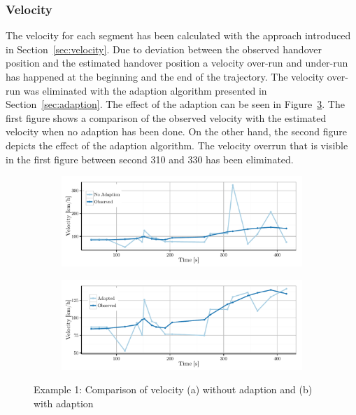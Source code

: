 \subsubsection{Velocity}
The velocity for each segment has been calculated with the approach introduced in Section~\ref{sec:velocity}. Due to deviation between the observed handover position and the estimated handover position a velocity over-run and under-run has happened at the beginning and the end of the trajectory. The velocity over-run was eliminated with the adaption algorithm presented in Section~\ref{sec:adaption}. The effect of the adaption can be seen in Figure~\ref{fig:563velocity}. The first figure shows a comparison of the observed velocity with the estimated velocity when no adaption has been done. On the other hand, the second figure depicts the effect of the adaption algorithm. The velocity overrun that is visible in the first figure between second 310 and 330 has been eliminated.
\begin{figure}
	\centering
	\begin{subfigure}[b]{\textwidth}
		\includegraphics[width=\textwidth]{./images/563_velocityNoAdapt}
		\caption{}
		\label{fig:563_velocityNoAdapt}
	\end{subfigure}%

	\begin{subfigure}[b]{\textwidth}
		\includegraphics[width=\textwidth]{./images/563_velocityAdapt}
		\caption{}
		\label{fig:563_velocityAdapt}
	\end{subfigure}
	\caption{Example 1: Comparison of velocity (a) without adaption  and (b) with adaption}\label{fig:563velocity}
\end{figure}


